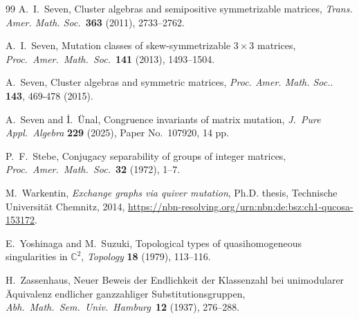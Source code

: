 \documentclass[11pt, letterpaper]{amsart}
\theoremstyle{definition}
\numberwithin{equation}{section}
\begin{document}
\begin{thebibliography}{99}
A.~I.~Seven,
Cluster algebras and semipositive symmetrizable matrices,
\textsl{Trans. Amer. Math. Soc.}\ \textbf{363} (2011), 2733--2762.

A.~I.~Seven, 
Mutation classes of skew-symmetrizable $3 \times 3$ matrices,
\textsl{Proc.\ Amer.\ Math.\ Soc.}\ \textbf{141} (2013), 1493--1504.

A.~Seven, 
Cluster algebras and symmetric matrices,
 {\em Proc. Amer. Math. Soc.}. 
 \textbf{143}, 469-478 (2015). %

A.~Seven and \.I.~\"Unal, 
Congruence invariants of matrix mutation, 
\textsl{J.~Pure Appl.\ Algebra} \textbf{229} (2025), Paper No.~107920, 14 pp.

P.~F.~Stebe, 
Conjugacy separability of groups of integer matrices, 
\textsl{Proc.\ Amer.\ Math.\ Soc.}\ \textbf{32} (1972), 1--7.



  
M.~Warkentin,  %
\emph{Exchange graphs via quiver mutation}, 
Ph.D. thesis, 
Technische Universit\"at Chemnitz, %
2014, 
\url{https://nbn-resolving.org/urn:nbn:de:bsz:ch1-qucosa-153172}.

E.~Yoshinaga and M.~Suzuki, 
Topological types of quasihomogeneous singularities in $\mathbb{C}^2$, 
\textsl{Topology} \textbf{18} (1979), 113--116.

H.~Zassenhaus, 
Neuer Beweis der Endlichkeit der Klassenzahl bei unimodularer \"Aquivalenz end\-licher ganzzahliger Substitutionsgruppen,
\textsl{Abh.\ Math.\ Sem.\ Univ.\ Hamburg}\ \textbf{12} (1937), 276--288.

\end{thebibliography}
\end{document}
